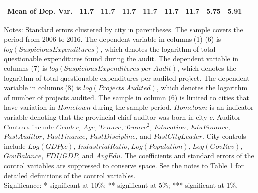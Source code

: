 \begin{table}[p]
\begin{threeparttable}
{\begin{tabular}{l*{8}{c}}
Mean of Dep. Var.   &        11.7         &        11.7         &        11.7         &        11.7         &        11.7         &        11.7         &        5.75         &        5.91         \\
\hline\hline
\end{tabular}}
\captionsetup{justification=justified,labelformat=empty}
\begin{tablenotes}
\item Notes: Standard errors clustered by city in parentheses. The sample covers the period from 2006 to 2016. The dependent variable in columns (1)-(6) is $ log(SuspiciousExpenditures) $, which denotes the logarithm of total questionable expenditures found during the audit. The dependent variable in columns (7) is $ log(SuspiciousExpenditures \; per \;Audit) $, which denotes the logarithm of total questionable expenditures per audited project. The dependent variable in columns (8) is $ log(Projects \; Audited) $, which denotes the logarithm of number of projects audited. The sample in column (6) is limited to cities that have variation in $ Hometown $ during the sample period. $ Hometown $ is an indicator variable denoting that the provincial chief auditor was born in city $ c $. Auditor Controls include $ Gender $, $ Age $, $ Tenure $, $ Tenure^2 $, $ Education $, $ EduFinance $, $ PastAuditor $, $ PastFinance $, $ PastDiscipline $, and $ PastCityLeader $. City controls include $ Log(GDP pc) $, $ IndustrialRatio $, $ Log(Population) $, $ Log(GovRev) $, $ GovBalance $, $ FDI/GDP $, and $ AvgEdu $. The coefficients and standard errors of the control variables are suppressed to conserve space. See the notes to Table 1 for detailed definitions of the control variables.   \\  Significance: * significant at 10\%; ** significant at 5\%; *** significant at 1\%.
\end{tablenotes}
\end{threeparttable}\end{table}
